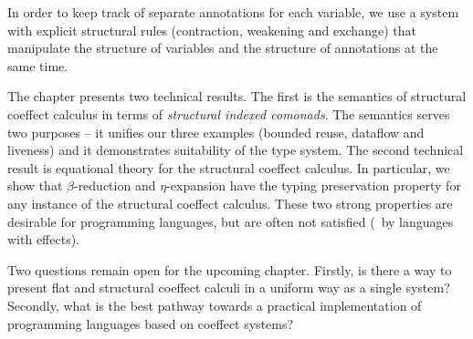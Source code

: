 In order to keep track of separate annotations for each variable, we use a system with
explicit structural rules (contraction, weakening and exchange) that manipulate the structure
of variables and the structure of annotations at the same time.

The chapter presents two technical results. The first is the semantics of structural coeffect
calculus in terms of \emph{structural indexed comonads}. The semantics serves two purposes --
it unifies our three examples (bounded reuse, dataflow and liveness) and it demonstrates
suitability of the type system. The second technical result is equational theory for the structural
coeffect calculus. In particular, we show that $\beta$-reduction and $\eta$-expansion have the
typing preservation property for any instance of the structural coeffect calculus. These two
strong properties are desirable for programming languages, but are often not satisfied
(\eg~by languages with effects).

Two questions remain open for the upcoming chapter. Firstly, is there a way to present
flat and structural coeffect calculi in a uniform way as a single system? Secondly, what
is the best pathway towards a practical implementation of programming languages based on
coeffect systems?
